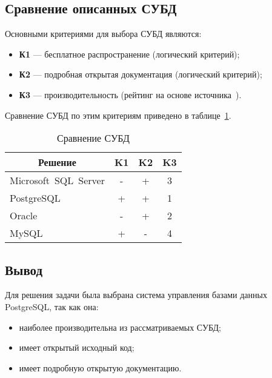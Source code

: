\subsection{Сравнение описанных СУБД}

Основными критериями для выбора СУБД являются:
\begin{itemize}
    \item \textbf{К1} --- бесплатное распространение (логический критерий);
    \item \textbf{К2} --- подробная открытая документация (логический критерий);
    \item \textbf{К3} --- производительность (рейтинг на основе
        источника~\cite{art08}).
\end{itemize}

Сравнение СУБД по этим критериям приведено в таблице~\ref{tab:02}.

\begin{table}[ht!]
\captionsetup{format=hang,justification=raggedright,
              singlelinecheck=off,width=9cm}
\centering
\caption{Сравнение СУБД\label{tab:02}}
\begin{tabular}[Hc]{|p{5cm}|c|c|c|}
    \hline
    \multicolumn{1}{|c}{\textbf{Решение}} & \multicolumn{1}{|c|}{\textbf{K1}} &
    \multicolumn{1}{c|}{\textbf{K2}} & \multicolumn{1}{c|}{\textbf{K3}}\\
    \hline
    \mbox{Microsoft SQL Server}  & - & + & 3\\
    \hline                                                           
    \mbox{PostgreSQL}            & + & + & 1\\
    \hline                                                           
    \mbox{Oracle}                & - & + & 2\\
    \hline                                                           
    \mbox{MySQL}                 & + & - & 4\\
    \hline
\end{tabular}
\end{table}

\subsection*{Вывод}

Для решения задачи была выбрана система управления базами данных
PostgreSQL, так как она:

\begin{itemize}
    \item наиболее производительна из рассматриваемых СУБД;
    \item имеет открытый исходный код;
    \item имеет подробную открытую документацию.
\end{itemize}

